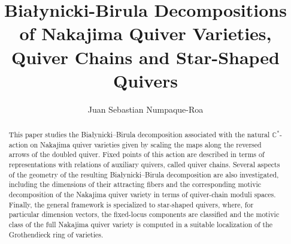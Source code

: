 \documentclass{amsart}
\author{Juan Sebastian Numpaque-Roa}
\theoremstyle{plain}
\numberwithin{equation}{section}
\theoremstyle{definition}
\theoremstyle{remark}
\begin{document}
	\title[Bia\l ynicki-Birula decompositions of Nakajima Quiver Varieties]{Bia\l ynicki-Birula Decompositions of Nakajima Quiver Varieties, Quiver Chains and Star-Shaped Quivers}
	\maketitle
	\begin{abstract}
This paper studies the Białynicki--Birula decomposition associated with the natural $\mathbb C^*$-action on Nakajima quiver varieties given by scaling the maps along the reversed arrows of the doubled quiver. Fixed points of this action are described in terms of representations with relations of auxiliary quivers, called quiver chains. Several aspects of the geometry of the resulting Bia\l ynicki--Birula decomposition are also investigated, including the dimensions of their attracting fibers and the corresponding motivic decomposition of the Nakajima quiver variety in terms of quiver-chain moduli spaces. Finally, the general framework is specialized to star-shaped quivers, where, for particular dimension vectors, the fixed-locus components are classified and the motivic class of the full Nakajima quiver variety is computed in a suitable localization of the Grothendieck ring of varieties.


	\end{abstract}
	\tableofcontents
\end{document}
